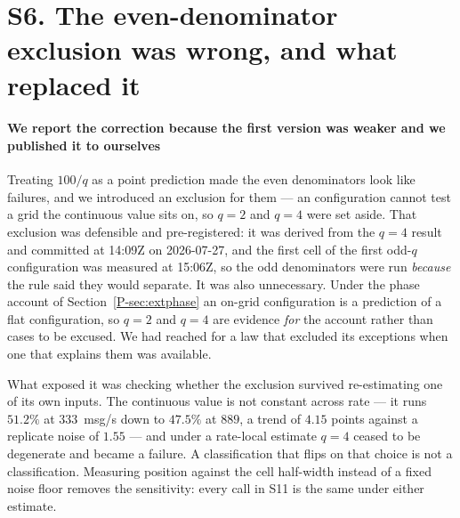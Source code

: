 \documentclass[10pt,journal,onecolumn]{IEEEtran}
\newcommand{\mainPhase}{\ref{P-sec:extphase}}            %
\begin{document}
\section{S6. The even-denominator exclusion was wrong, and what replaced it}

\paragraph{We report the correction because the first version was weaker and we published it to
ourselves} Treating $100/q$ as a point prediction made the even denominators look like failures, and
we introduced an exclusion for them --- an configuration cannot test a grid the continuous value sits on, so
$q=2$ and $q=4$ were set aside. That exclusion was defensible and pre-registered: it was derived from
the $q=4$ result and committed at 14:09Z on 2026-07-27, and the first cell of the first odd-$q$ configuration
was measured at 15:06Z, so the odd denominators were run \emph{because} the rule said they would
separate. It was also unnecessary. Under the phase account of Section~\mainPhase{} an on-grid configuration is a prediction of a
flat configuration, so $q=2$ and $q=4$ are evidence \emph{for} the account rather than cases to be excused. We
had reached for a law that excluded its exceptions when one that explains them was available.

What exposed it was checking whether the exclusion survived re-estimating one of its own inputs. The
continuous value is not constant across rate --- it runs $51.2\%$ at $333$~msg/s down to $47.5\%$ at
$889$, a trend of $4.15$ points against a replicate noise of $1.55$ --- and under a rate-local
estimate $q=4$ ceased to be degenerate and became a failure. A classification that flips on that
choice is not a classification. Measuring position against the cell half-width instead of a fixed
noise floor removes the sensitivity: every call in S11 is the same under either estimate.
\end{document}
